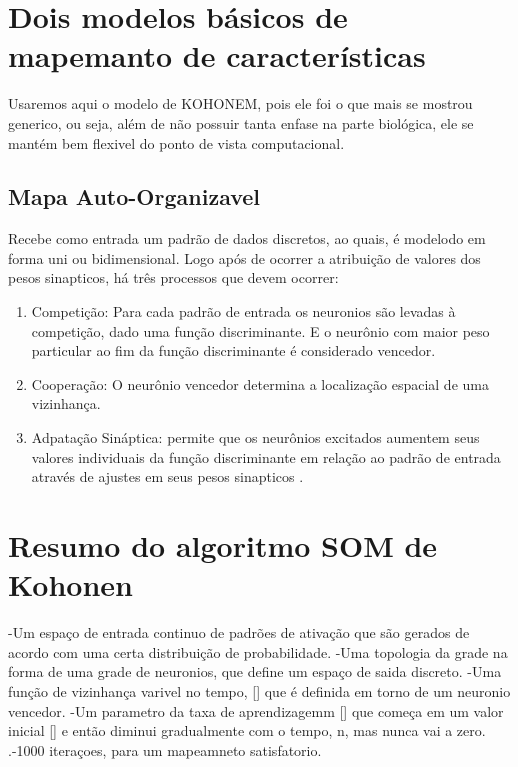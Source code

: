\section {Dois modelos básicos de mapemanto de características}
	Usaremos aqui o modelo de KOHONEM, pois ele foi o que mais se mostrou generico, ou seja, além de não possuir tanta enfase na parte biológica, ele se mantém bem flexivel do ponto de vista computacional.

\subsection {Mapa Auto-Organizavel}
\quad Recebe como entrada um padrão de dados discretos, ao quais, é modelodo em forma uni ou bidimensional.
	 Logo após de ocorrer a atribuição de valores dos pesos sinapticos, há três processos que devem ocorrer:
\begin {enumerate}

	\item Competição: Para cada padrão de entrada os neuronios são levadas à competição, dado uma função discriminante. E o neurônio com maior peso particular ao fim da função discriminante é considerado vencedor.
	\item Cooperação: O neurônio vencedor determina a localização espacial de uma vizinhança.
	\item Adpatação Sináptica: permite que os neurônios excitados aumentem seus valores individuais da função discriminante em relação ao padrão de entrada através de ajustes em seus pesos sinapticos .
\end{enumerate}

\section {Resumo do algoritmo SOM de Kohonen}

-Um espaço de entrada continuo de padrões de ativação que são gerados de acordo com uma certa distribuição de probabilidade.
-Uma topologia da grade na forma de uma grade de neuronios, que define um espaço de saida discreto.
-Uma função de vizinhança varivel no tempo, [] que é definida em torno de um neuronio vencedor.
-Um parametro da taxa de aprendizagemm [] que começa em um valor inicial [] e então diminui gradualmente com o  tempo, n, mas nunca vai a zero.
.-1000 iteraçoes, para um mapeamneto satisfatorio.

